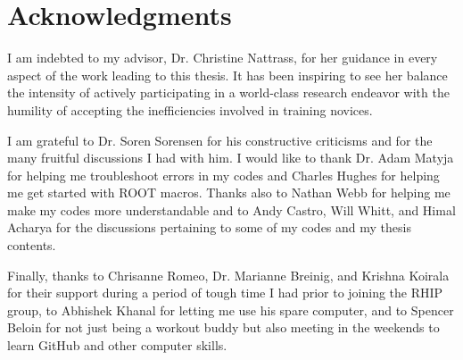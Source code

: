 \chapter*{Acknowledgments}\label{ch:acknowledgments}
I am indebted to my advisor, Dr. Christine Nattrass, for her guidance in every aspect of the work leading to this thesis. It has been inspiring to see her balance the intensity of actively participating in a world-class research endeavor with the humility of accepting the inefficiencies involved in training novices.

I am grateful to Dr. Soren Sorensen for his constructive criticisms and for the many fruitful discussions I had with him. I would like to thank Dr. Adam Matyja for helping me troubleshoot errors in my codes and Charles Hughes for helping me get started with ROOT macros. Thanks also to Nathan Webb for helping me make my codes more understandable and to Andy Castro, Will Whitt, and Himal Acharya for the discussions pertaining to some of my codes and my thesis contents.

Finally, thanks to Chrisanne Romeo, Dr. Marianne Breinig, and Krishna Koirala for their support during a period of tough time I had prior to joining the RHIP group, to Abhishek Khanal for letting me use his spare computer, and to Spencer Beloin for not just being a workout buddy but also meeting in the weekends to learn GitHub and other computer skills.
